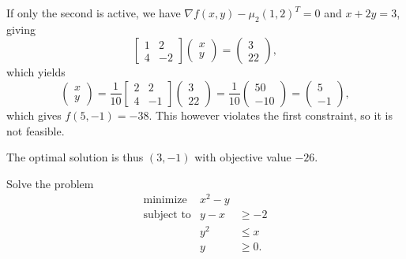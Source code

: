 \begin{solution}
  If only the second is active, we have $\nabla f(x, y) - \mu_2 (1, 2)^T = 0$ and $x + 2y = 3$, giving
  \begin{equation}
    \begin{bmatrix}
      1 & 2 \\
      4 & -2
    \end{bmatrix}
    \begin{pmatrix}
      x \\ y
    \end{pmatrix} =
    \begin{pmatrix}
      3 \\ 22
    \end{pmatrix},
  \end{equation}
  which yields
  \begin{equation}
    \begin{pmatrix} x \\ y
    \end{pmatrix} =
    \frac{1}{10}
    \begin{bmatrix}
      2 & 2 \\ 4 & -1
    \end{bmatrix}
    \begin{pmatrix}
      3 \\ 22
    \end{pmatrix} =
    \frac{1}{10}
    \begin{pmatrix}
      50 \\ -10
    \end{pmatrix} =
    \begin{pmatrix}
      5 \\ -1
    \end{pmatrix},
  \end{equation}
  which gives $f(5, -1) = -38$.
  This however violates the first constraint, so it is not feasible.

  The optimal solution is thus $(3, -1)$ with objective value $-26$.
\end{solution}

\begin{exercise}
  Solve the problem
  \begin{equation}
    \begin{array}{rrl}
      \text{minimize} & x^2 - y \\
      \text{subject to} & y - x &\geq -2 \\
      & y^2 &\leq x \\
      & y &\geq 0.
    \end{array}
  \end{equation}
\end{exercise}

